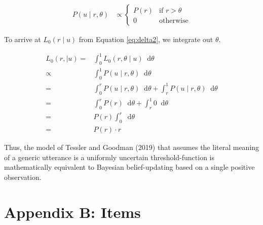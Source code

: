 \documentclass[floatsintext,doc]{apa6}
\begin{document}
\begin{align}
P(u \mid r, \theta)  &\propto \begin{cases}
P(r) & \text{if } r > \theta \\
0 & \text{otherwise} \end{cases} \label{eq:delta2}
\end{align}

\noindent To arrive at \(L_0(r \mid u)\) from Equation \ref{eq:delta2}, we integrate out \(\theta\).

\begin{align}
L_0(r, \mid u) =& \int_{0}^{1} L_0(r, \theta \mid u) \mathop{}\!\mathrm{d}\theta \nonumber \\
\propto& \int_{0}^{1} P(u \mid r, \theta)  \mathop{}\!\mathrm{d}\theta \nonumber \\
=& \int_{0}^{r} P(u \mid r, \theta) \mathop{}\!\mathrm{d}\theta + \int_{r}^{1}P(u \mid r, \theta) \mathop{}\!\mathrm{d}\theta \nonumber \\
=& \int_{0}^{r} P(r) \mathop{}\!\mathrm{d}\theta + \int_{r}^{1} 0 \mathop{}\!\mathrm{d}\theta \nonumber  \\ 
   = &  P(r) \int_{0}^{r} \mathop{}\!\mathrm{d}\theta \nonumber \\
     = &   P(r) \cdot r \label{eq:L0d}
\end{align}

Thus, the model of Tessler and Goodman (2019) that assumes the literal meaning of a generic utterance is a uniformly uncertain threshold-function is mathematically equivalent to Bayesian belief-updating based on a single positive observation. 

\newpage
\hypertarget{appendix-items}{%
\section{Appendix B: Items}\label{appendix-items}}
\end{document}
